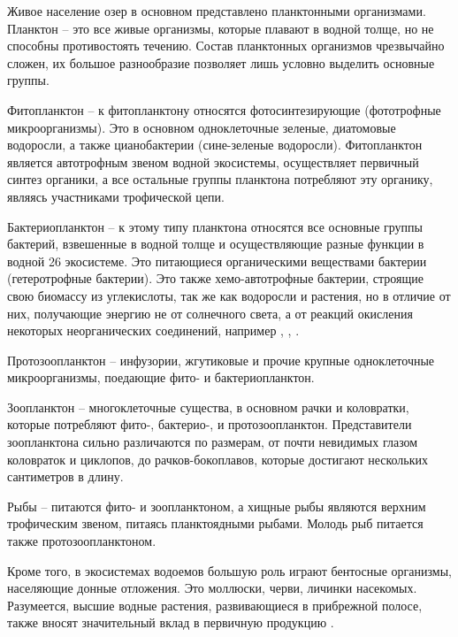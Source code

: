 Живое население озер в основном представлено планктонными организмами. Планктон –
это все живые организмы, которые плавают в водной толще, но не способны противостоять
течению. Состав планктонных организмов чрезвычайно сложен, их большое разнообразие
позволяет лишь условно выделить основные группы.

Фитопланктон – к фитопланктону относятся фотосинтезирующие (фототрофные микроорганизмы). Это в основном одноклеточные зеленые, диатомовые водоросли, а также цианобактерии (сине-зеленые водоросли). Фитопланктон является автотрофным звеном водной
экосистемы, осуществляет первичный синтез органики, а все остальные группы планктона
потребляют эту органику, являясь участниками трофической цепи.

Бактериопланктон – к этому типу планктона относятся все основные группы бактерий,
взвешенные в водной толще и осуществляющие разные функции в водной 26 экосистеме.
Это питающиеся органическими веществами бактерии (гетеротрофные бактерии). Это также
хемо-автотрофные бактерии, строящие свою биомассу из углекислоты, так же как водоросли
и растения, но в отличие от них, получающие энергию не от солнечного света, а от реакций
окисления некоторых неорганических соединений, например ,  , .

Протозоопланктон – инфузории, жгутиковые и прочие крупные одноклеточные микроорганизмы, поедающие фито- и бактериопланктон.

Зоопланктон – многоклеточные существа, в основном рачки и коловратки, которые потребляют фито-, бактерио-, и протозоопланктон. Представители зоопланктона сильно различаются по размерам, от почти невидимых глазом коловраток и циклопов, до рачков-бокоплавов, которые достигают нескольких сантиметров в длину.

Рыбы – питаются фито- и зоопланктоном, а хищные рыбы являются верхним трофическим звеном, питаясь планктоядными рыбами. Молодь рыб питается также протозоопланктоном.

Кроме того, в экосистемах водоемов большую роль играют бентосные организмы, населяющие донные отложения. Это моллюски, черви, личинки насекомых. Разумеется, высшие
водные растения, развивающиеся в прибрежной полосе, также вносят значительный вклад
в первичную продукцию \cite{BioPhys10}.

